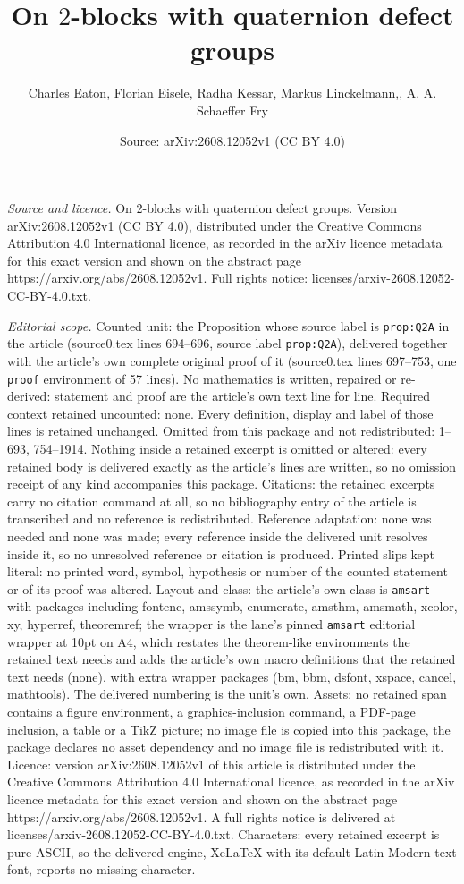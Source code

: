 \documentclass[10pt,a4paper]{amsart}
\title[On $2$-blocks with quaternion defect groups]{On $2$-blocks with quaternion defect groups}
\author{Charles Eaton, Florian Eisele, Radha Kessar, Markus Linckelmann,, A. A. Schaeffer Fry}
\date{Source: arXiv:2608.12052v1 (CC BY 4.0)}
\begin{document}
\maketitle

\noindent\emph{Source and licence.} On $2$-blocks with quaternion defect groups. Version arXiv:2608.12052v1 (CC BY 4.0), distributed under the Creative Commons Attribution 4.0 International licence, as recorded in the arXiv licence metadata for this exact version and shown on the abstract page https://arxiv.org/abs/2608.12052v1. Full rights notice: licenses/arxiv-2608.12052-CC-BY-4.0.txt.\par\smallskip

\noindent\textit{Editorial scope.} Counted unit: the Proposition whose source label is \texttt{prop:Q2A} in the article (source0.tex lines 694--696, source label \texttt{prop:Q2A}), delivered together with the article's own complete original proof of it (source0.tex lines 697--753, one \texttt{proof} environment of 57 lines). No mathematics is written, repaired or re-derived: statement and proof are the article's own text line for line. Required context retained uncounted: none. Every definition, display and label of those lines is retained unchanged. Omitted from this package and not redistributed: 1--693, 754--1914. Nothing inside a retained excerpt is omitted or altered: every retained body is delivered exactly as the article's lines are written, so no omission receipt of any kind accompanies this package. Citations: the retained excerpts carry no citation command at all, so no bibliography entry of the article is transcribed and no reference is redistributed. Reference adaptation: none was needed and none was made; every reference inside the delivered unit resolves inside it, so no unresolved reference or citation is produced. Printed slips kept literal: no printed word, symbol, hypothesis or number of the counted statement or of its proof was altered. Layout and class: the article's own class is \texttt{amsart} with packages including fontenc, amssymb, enumerate, amsthm, amsmath, xcolor, xy, hyperref, theoremref; the wrapper is the lane's pinned \texttt{amsart} editorial wrapper at 10pt on A4, which restates the theorem-like environments the retained text needs and adds the article's own macro definitions that the retained text needs (none), with extra wrapper packages (bm, bbm, dsfont, xspace, cancel, mathtools). The delivered numbering is the unit's own. Assets: no retained span contains a figure environment, a graphics-inclusion command, a PDF-page inclusion, a table or a TikZ picture; no image file is copied into this package, the package declares no asset dependency and no image file is redistributed with it. Licence: version arXiv:2608.12052v1 of this article is distributed under the Creative Commons Attribution 4.0 International licence, as recorded in the arXiv licence metadata for this exact version and shown on the abstract page https://arxiv.org/abs/2608.12052v1. A full rights notice is delivered at licenses/arxiv-2608.12052-CC-BY-4.0.txt. Characters: every retained excerpt is pure ASCII, so the delivered engine, XeLaTeX with its default Latin Modern text font, reports no missing character.
\end{document}
